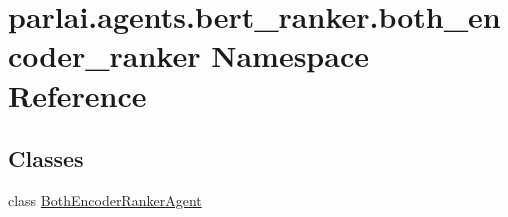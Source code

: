 \hypertarget{namespaceparlai_1_1agents_1_1bert__ranker_1_1both__encoder__ranker}{}\section{parlai.\+agents.\+bert\+\_\+ranker.\+both\+\_\+encoder\+\_\+ranker Namespace Reference}
\label{namespaceparlai_1_1agents_1_1bert__ranker_1_1both__encoder__ranker}
\subsection*{Classes}
\begin{DoxyCompactItemize}
\item 
class \hyperlink{classparlai_1_1agents_1_1bert__ranker_1_1both__encoder__ranker_1_1BothEncoderRankerAgent}{Both\+Encoder\+Ranker\+Agent}
\end{DoxyCompactItemize}
